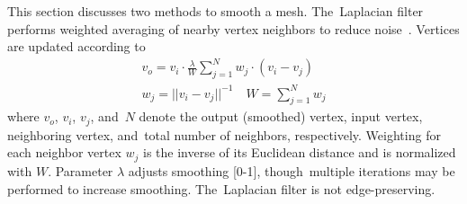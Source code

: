 
This section discusses two methods to smooth a mesh. The~Laplacian filter performs weighted averaging of nearby vertex neighbors to reduce noise~\cite{taubin_curve_1995}. Vertices are updated according to
\begin{align}
  v_o = v_i \cdot \frac{\lambda}{W} \sum_{j=1}^{N} w_j \cdot (v_i-v_j) \label{eq:ch3_laplacian_vertex}  \\
  w_j = ||v_i-v_j||^{-1} \quad \label{eq:ch3_laplacian_weight}
  W = \sum_{j=1}^{N} w_j
\end{align}
where $v_o$, $v_i$, $v_j$, and~$N$ denote the output (smoothed) vertex, input vertex, neighboring vertex, and~total number of neighbors, respectively. Weighting for each neighbor vertex $w_j$ is the inverse of its Euclidean distance and is normalized with $W$.  Parameter $\lambda$ adjusts smoothing [0-1], though~multiple iterations may be performed to increase smoothing. The~Laplacian filter is not edge-preserving. %

